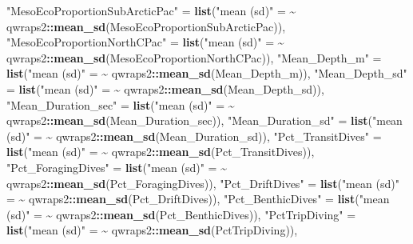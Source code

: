 \documentclass[
]{article}
\newenvironment{Shaded}{\begin{snugshade}}{\end{snugshade}}
\newcommand{\ErrorTok}[1]{\textcolor[rgb]{0.64,0.00,0.00}{\textbf{#1}}}
\newcommand{\FunctionTok}[1]{\textcolor[rgb]{0.13,0.29,0.53}{\textbf{#1}}}
\newcommand{\NormalTok}[1]{#1}
\newcommand{\OtherTok}[1]{\textcolor[rgb]{0.56,0.35,0.01}{#1}}
\newcommand{\SpecialCharTok}[1]{\textcolor[rgb]{0.81,0.36,0.00}{\textbf{#1}}}
\newcommand{\StringTok}[1]{\textcolor[rgb]{0.31,0.60,0.02}{#1}}
\begin{document}
\begin{Shaded}
\begin{Highlighting}[]
       \StringTok{"MesoEcoProportionSubArcticPac"} \OtherTok{=} \FunctionTok{list}\NormalTok{(}\StringTok{"mean (sd)"} \OtherTok{=} \ErrorTok{\textasciitilde{}}\NormalTok{ qwraps2}\SpecialCharTok{::}\FunctionTok{mean\_sd}\NormalTok{(MesoEcoProportionSubArcticPac)),}
       \StringTok{"MesoEcoProportionNorthCPac"} \OtherTok{=} \FunctionTok{list}\NormalTok{(}\StringTok{"mean (sd)"} \OtherTok{=} \ErrorTok{\textasciitilde{}}\NormalTok{ qwraps2}\SpecialCharTok{::}\FunctionTok{mean\_sd}\NormalTok{(MesoEcoProportionNorthCPac)),}
       \StringTok{"Mean\_Depth\_m"} \OtherTok{=} \FunctionTok{list}\NormalTok{(}\StringTok{"mean (sd)"} \OtherTok{=} \ErrorTok{\textasciitilde{}}\NormalTok{ qwraps2}\SpecialCharTok{::}\FunctionTok{mean\_sd}\NormalTok{(Mean\_Depth\_m)),}
       \StringTok{"Mean\_Depth\_sd"} \OtherTok{=} \FunctionTok{list}\NormalTok{(}\StringTok{"mean (sd)"} \OtherTok{=} \ErrorTok{\textasciitilde{}}\NormalTok{ qwraps2}\SpecialCharTok{::}\FunctionTok{mean\_sd}\NormalTok{(Mean\_Depth\_sd)),}
       \StringTok{"Mean\_Duration\_sec"} \OtherTok{=} \FunctionTok{list}\NormalTok{(}\StringTok{"mean (sd)"} \OtherTok{=} \ErrorTok{\textasciitilde{}}\NormalTok{ qwraps2}\SpecialCharTok{::}\FunctionTok{mean\_sd}\NormalTok{(Mean\_Duration\_sec)),}
       \StringTok{"Mean\_Duration\_sd"} \OtherTok{=} \FunctionTok{list}\NormalTok{(}\StringTok{"mean (sd)"} \OtherTok{=} \ErrorTok{\textasciitilde{}}\NormalTok{ qwraps2}\SpecialCharTok{::}\FunctionTok{mean\_sd}\NormalTok{(Mean\_Duration\_sd)),}
       \StringTok{"Pct\_TransitDives"} \OtherTok{=} \FunctionTok{list}\NormalTok{(}\StringTok{"mean (sd)"} \OtherTok{=} \ErrorTok{\textasciitilde{}}\NormalTok{ qwraps2}\SpecialCharTok{::}\FunctionTok{mean\_sd}\NormalTok{(Pct\_TransitDives)),}
       \StringTok{"Pct\_ForagingDives"} \OtherTok{=} \FunctionTok{list}\NormalTok{(}\StringTok{"mean (sd)"} \OtherTok{=} \ErrorTok{\textasciitilde{}}\NormalTok{ qwraps2}\SpecialCharTok{::}\FunctionTok{mean\_sd}\NormalTok{(Pct\_ForagingDives)),}
       \StringTok{"Pct\_DriftDives"} \OtherTok{=} \FunctionTok{list}\NormalTok{(}\StringTok{"mean (sd)"} \OtherTok{=} \ErrorTok{\textasciitilde{}}\NormalTok{ qwraps2}\SpecialCharTok{::}\FunctionTok{mean\_sd}\NormalTok{(Pct\_DriftDives)),}
       \StringTok{"Pct\_BenthicDives"} \OtherTok{=} \FunctionTok{list}\NormalTok{(}\StringTok{"mean (sd)"} \OtherTok{=} \ErrorTok{\textasciitilde{}}\NormalTok{ qwraps2}\SpecialCharTok{::}\FunctionTok{mean\_sd}\NormalTok{(Pct\_BenthicDives)),}
       \StringTok{"PctTripDiving"} \OtherTok{=} \FunctionTok{list}\NormalTok{(}\StringTok{"mean (sd)"} \OtherTok{=} \ErrorTok{\textasciitilde{}}\NormalTok{ qwraps2}\SpecialCharTok{::}\FunctionTok{mean\_sd}\NormalTok{(PctTripDiving)),}

\end{Highlighting}
\end{Shaded}
\end{document}
